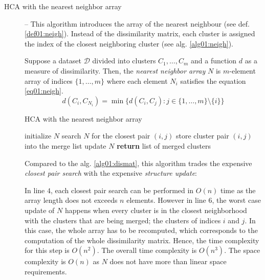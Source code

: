 \begin{description}
	\item[HCA with the nearest neighbor array] -- This algorithm introduces the array of the nearest neighbour (see def. \ref{def01:neigh}). Instead of the dissimilarity matrix, each cluster is assigned the index of the closest neighboring cluster (see alg. \ref{alg01:neigh}).
	
	\begin{defn}
		Suppose a dataset $\mathcal{D}$ divided into clusters $C_1,\dots,C_m$ and a function $d$ as a measure of dissimilarity. Then, the \emph{nearest neighbor array} $N$ is $m$-element array of indices $\{1,\dots,m\}$ where each element $N_i$ satisfies the equation \ref{eq01:neigh}.
		\begin{equation}
			d(C_i,C_{N_i}) = \min\{d(C_i,C_j) : j \in \{1,\dots,m\} \setminus \{i\}\}
			\label{eq01:neigh}
		\end{equation}
		
		\label{def01:neigh}
	\end{defn}
	
	\begin{algorithm}
		\caption{HCA with the nearest neighbor array}
		\label{alg01:neigh}
		\begin{algorithmic}[1]
			\State initialize $N$
			\State search $N$ for the closest pair $(i,j)$ 
			\State store cluster pair $(i,j)$ into the merge list 
			\State update $N$ 
			\EndFor
			\State \textbf{return} list of merged clusters
			\EndProcedure
		\end{algorithmic}
	\end{algorithm}
	
	Compared to the alg. \ref{alg01:dismat}, this algorithm trades the expensive \emph{closest pair search} with the expensive \emph{structure update}:
	
	 In line $4$, each closest pair search can be performed in $O(n)$ time as the array length does not exceeds $n$ elements. However in line $6$, the worst case update of $N$ happens when every cluster is in the closest neighborhood with the clusters that are being merged; the clusters of indices $i$ and $j$. In this case, the whole array has to be recomputed, which corresponds to the computation of the whole dissimilarity matrix. Hence, the time complexity for this step is $O(n^2)$. The overall time complexity is $O(n^3)$. The space complexity is $O(n)$ as $N$ does not have more than linear space requirements.
	 

\end{description}
